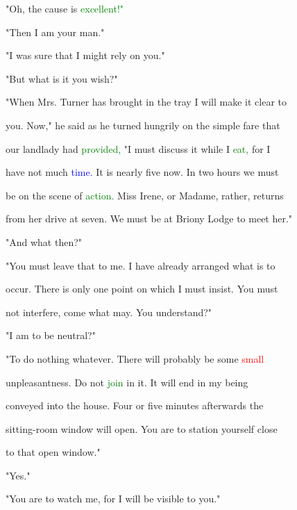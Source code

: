  "Oh, the cause is \textcolor{green}{excellent!"}



 "Then I am your man."



 "I was sure that I might rely on you."



 "But what is it you wish?"



 "When Mrs. Turner has brought in the tray I will make it clear to

 you. Now," he said as he turned hungrily on the simple fare that

 our landlady had \textcolor{green}{provided,} "I must discuss it while I \textcolor{green}{eat,} for I

 have not much \textcolor{blue}{time.} It is nearly five now. In two hours we must

 be on the scene of \textcolor{green}{action.} Miss Irene, or Madame, rather, returns

 from her drive at seven. We must be at Briony Lodge to meet her."



 "And what then?"



 "You must \textcolor{BurntOrange}{leave} that to me. I have already arranged what is to

 occur. There is only one point on which I must insist. You must

 not interfere, come what may. You understand?"



 "I am to be \textcolor{BurntOrange}{neutral?"}



 "To do nothing whatever. There will probably be some \textcolor{red}{small}

 unpleasantness. Do not \textcolor{green}{join} in it. It will end in my being

 conveyed into the house. Four or five minutes afterwards the

 sitting-room window will open. You are to station yourself close

 to that open window."



 "Yes."



 "You are to \textcolor{BurntOrange}{watch} me, for I will be visible to you."



